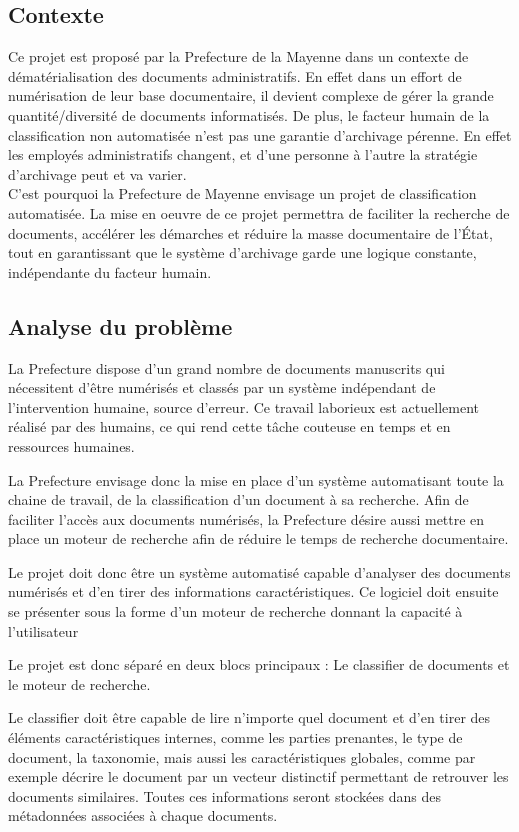 

\subsection {Contexte}

Ce projet est proposé par la Prefecture de la Mayenne dans un contexte de dématérialisation des documents administratifs.
En effet dans un effort de numérisation de leur base documentaire, il devient complexe de gérer la grande quantité/diversité de documents informatisés. 
De plus, le facteur humain de la classification non automatisée n'est pas une garantie d'archivage pérenne.
En effet les employés administratifs changent, et d'une personne à l'autre la stratégie d'archivage peut et va varier. \\

C'est pourquoi la Prefecture de Mayenne envisage un projet de classification automatisée.
La mise en oeuvre de ce projet permettra de faciliter la recherche de documents, accélérer les démarches et réduire la masse documentaire de l'État, tout en garantissant que le système d'archivage garde une logique constante, indépendante du facteur humain.


\subsection {Analyse du problème}
La Prefecture dispose d'un grand nombre de documents manuscrits qui nécessitent d'être numérisés et classés par un système indépendant de l'intervention humaine, source d'erreur.
Ce travail laborieux est actuellement réalisé par des humains, ce qui rend cette tâche couteuse en temps et en ressources humaines.

La Prefecture envisage donc la mise en place d'un système automatisant toute la chaine de travail, de la classification d'un document à sa recherche.
Afin de faciliter l'accès aux documents numérisés, la Prefecture désire aussi mettre en place un moteur de recherche afin de réduire le temps de recherche documentaire.


Le projet doit donc être un système automatisé capable d'analyser des documents numérisés et d'en tirer des informations caractéristiques.
Ce logiciel doit ensuite se présenter sous la forme d'un moteur de recherche donnant la capacité à l'utilisateur 

Le projet est donc séparé en deux blocs principaux :
Le classifier de documents et le moteur de recherche.


Le classifier doit être capable de lire n'importe quel document et d'en tirer des éléments caractéristiques internes, comme les parties prenantes, le type de document, la taxonomie, mais aussi les caractéristiques globales, comme par exemple décrire le document par un vecteur distinctif permettant de retrouver les documents similaires.
Toutes ces informations seront stockées dans des métadonnées associées à chaque documents.


